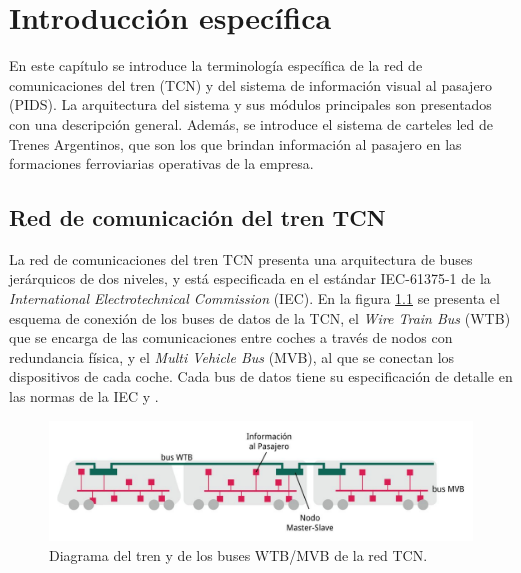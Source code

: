 \chapter{Introducción específica} %

\label{Chapter2}

En este capítulo se introduce la terminología específica de la red de comunicaciones del tren (TCN) y del sistema de información visual al pasajero (PIDS). La arquitectura del sistema y  sus módulos principales son presentados con una descripción general. Además, se introduce el sistema de carteles led de Trenes Argentinos, que son los que brindan información al pasajero en las formaciones ferroviarias operativas de la empresa.\\


\section{Red de comunicación del tren TCN}

La red de comunicaciones del tren TCN presenta una arquitectura de buses jerárquicos de dos niveles, y está especificada en el estándar IEC-61375-1 \cite{IEC-61375-1999} de la \textit{International Electrotechnical Commission} (IEC). En la figura \ref{fig:redTCN} se presenta el esquema de conexión de los buses de datos de la TCN, el \textit{Wire Train Bus} (WTB) que se encarga de las comunicaciones entre coches a través de nodos con redundancia física, y el \textit{Multi Vehicle Bus} (MVB), al que se conectan los dispositivos de cada coche. 
Cada bus de datos tiene su especificación de detalle en las normas de la IEC \citep{CSN-EN-61375-2-1} y \citep{IEC-61375-3-1:2012}. \\

\begin{figure}[H]
	\centering
	\includegraphics[width=1\textwidth]{./Figures/diagramaRedTCN.png}
	\caption{Diagrama del tren y de los buses WTB/MVB de la red TCN.}
	\label{fig:redTCN}
\end{figure}

